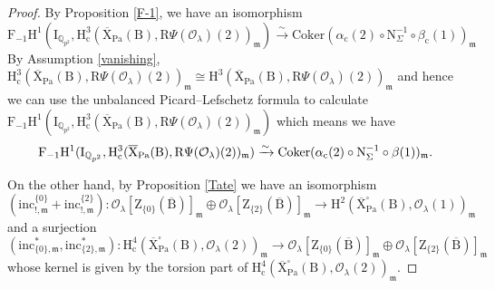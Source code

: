\documentclass[10pt]{amsart}
\numberwithin{equation}{section}
\theoremstyle{definition}
\def\Coker{\mathrm{Coker}}
\def\Pa{\mathrm{Pa}}
\def\calO{\mathcal{O}}
\def\fracm{\mathfrak{m}}
\def\QQ{\mathbb{Q}}
\def\rmc{\mathrm{c}}
\def\rmB{\mathrm{B}}
\def\rmH{\mathrm{H}}
\def\rmN{\mathrm{N}}
\def\rmR{\mathrm{R}}
\def\rmX{\mathrm{X}}
\def\rmZ{\mathrm{Z}}
\begin{document}
\begin{proof}
By Proposition \ref{F-1}, we have an isomorphism
\begin{equation*}
\mathrm{F}_{-1}\mathrm{H}^{1}(\mathrm{I}_{\QQ_{p^{2}}}, \rmH^{3}_{\rmc}(\overline{\rmX}_{\Pa}(\rmB), \rmR\Psi(\calO_{\lambda})(2))_{\fracm})\xrightarrow{\sim} \Coker(\alpha_{\rmc}(2)\circ \rmN^{-1}_{\Sigma}\circ \beta_{\rmc}(1))_{\fracm}
\end{equation*}
By Assumption \ref{vanishing}, $\rmH^{3}_{\rmc}(\overline{\rmX}_{\Pa}(\rmB), \rmR\Psi(\calO_{\lambda})(2))_{\fracm}\cong \rmH^{3}(\overline{\rmX}_{\Pa}(\rmB), \rmR\Psi(\calO_{\lambda})(2))_{\fracm}$ and hence we can use the unbalanced Picard--Lefschetz formula to calculate $\mathrm{F}_{-1}\mathrm{H}^{1}(\mathrm{I}_{\QQ_{p^{2}}}, \rmH^{3}_{\rmc}(\overline{\rmX}_{\Pa}(\rmB), \rmR\Psi(\calO_{\lambda})(2))_{\fracm})$ which means we have
\begin{equation*}
\mathrm{F}_{-1}\mathrm{H}^{1}(\mathrm{I}_{\QQ_{p^{2}}}, \rmH^{3}_{\rmc}(\overline{\rmX}_{\Pa}(\rmB), \rmR\Psi(\calO_{\lambda})(2))_{\fracm})\xrightarrow{\sim} \Coker(\alpha_{\rmc}(2)\circ \rmN^{-1}_{\Sigma}\circ \beta(1))_{\fracm}.\\
\end{equation*}

On the other hand, by Proposition \ref{Tate} we have an isomorphism
\begin{equation*}
(\mathrm{inc}^{\{0\}}_{!, \fracm}+\mathrm{inc}^{\{2\}}_{!, \fracm}):\calO_{\lambda}[\rmZ_{\{0\}}(\overline{\rmB})]_{\fracm}\oplus\calO_{\lambda}[\rmZ_{\{2\}}(\overline{\rmB})]_{\fracm} \rightarrow  \rmH^{2}(\overline{\rmX}^{\square}_{\Pa}(\rmB), \calO_{\lambda}(1))_{\fracm}
\end{equation*}
and a surjection 
\begin{equation*}
(\mathrm{inc}^{\ast}_{\{0\}, \fracm}, \mathrm{inc}^{\ast}_{\{2\}, \fracm}): \rmH^{4}_{\rmc}(\overline{\rmX}^{\square}_{\Pa}(\rmB), \calO_{\lambda}(2))_{\fracm}\rightarrow \calO_{\lambda}[\rmZ_{\{0\}}(\overline{\rmB})]_{\fracm}\oplus\calO_{\lambda}[\rmZ_{\{2\}}(\overline{\rmB})]_{\fracm} 
\end{equation*}
whose kernel is given by the torsion part of $\rmH^{4}_{\rmc}(\overline{\rmX}^{\square}_{\Pa}(\rmB), \calO_{\lambda}(2))_{\fracm}$.


\end{proof}
\end{document}
